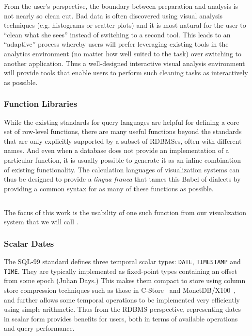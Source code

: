 From the user's perspective, the boundary between preparation and analysis is not nearly so clean cut. Bad data is often discovered using visual analysis techniques (e.g. histograms or scatter plots) and it is most natural for the user to ``clean what she sees'' instead of switching to a second tool. This leads to an ``adaptive'' process whereby users will prefer leveraging existing tools in the analytics environment (no matter how well suited to the task) over switching to another application. Thus a well-designed interactive visual analysis environment will provide tools that enable users to perform such cleaning tasks as interactively as possible.

\subsubsection{Function Libraries}
While the existing standards for query languages are helpful for defining a core set of row-level functions, there are many useful functions beyond the standards that are only explicitly supported by a subset of RDBMSes, often with different names. And even when a database does not provide an implementation of a particular function, it is usually possible to generate it as an inline combination of existing functionality. The calculation languages of visualization systems can thus be designed to provide a \textit{lingua franca} that tames this Babel of dialects by providing a common syntax for as many of these functions as possible.

\subsection{\dateparse}
The focus of this work is the usability of one such function from our visualization system that we will call \dateparse.

\subsubsection{	Scalar Dates}

The SQL-99 standard defines three temporal scalar types: \texttt{DATE}, \texttt{TIMESTAMP} and \texttt{TIME}. They are typically implemented as fixed-point types containing an offset from some epoch (\eg Julian Days.) This makes them compact to store using column store compression techniques such as those in C-Store~\cite{Stonebraker:2005} and MonetDB/X100~\cite{Zukowski:2006}, and further allows some temporal operations to be implemented very efficiently using simple arithmetic. Thus from the RDBMS perspective, representing dates in scalar form provides  benefits for users, both in terms of available operations and query performance.

